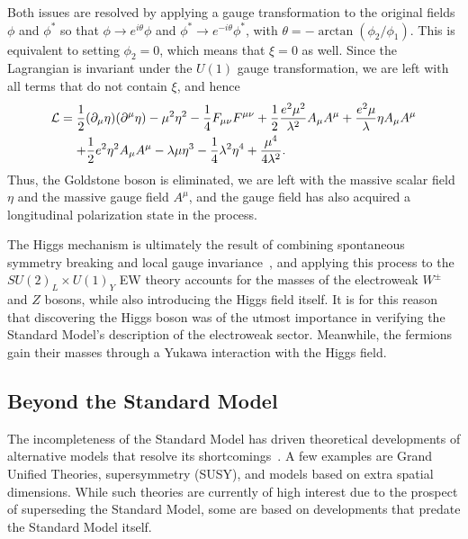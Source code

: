 Both issues are resolved by applying a gauge transformation to the original fields $\phi$ and $\phi^*$ so that $\phi\to e^{i\theta}\phi$ and $\phi^*\to e^{-i\theta}\phi^*$, with $\theta=-\arctan(\phi_2/\phi_1)$.
This is equivalent to setting $\phi_2=0$, which means that $\xi=0$ as well.
Since the Lagrangian is invariant under the $U(1)$ gauge transformation, we are left with all terms that do not contain $\xi$, and hence
\begin{equation}
  \begin{aligned}
    \mathcal{L} &= \frac{1}{2}(\partial_\mu\eta)(\partial^\mu\eta)-\mu^2\eta^2-\frac{1}{4}F_{\mu\nu}F^{\mu\nu}+\frac{1}{2}\frac{e^2\mu^2}{\lambda^2}A_\mu A^\mu+\frac{e^2\mu}{\lambda}\eta A_\mu A^\mu\\
    &\equad+ \frac{1}{2}e^2\eta^2A_\mu A^\mu-\lambda\mu\eta^3-\frac{1}{4}\lambda^2\eta^4+\frac{\mu^4}{4\lambda^2}.
  \end{aligned}
\end{equation}
Thus, the Goldstone boson is eliminated, we are left with the massive scalar field $\eta$ and the massive gauge field $A^\mu$, and the gauge field has also acquired a longitudinal polarization state in the process.

The Higgs mechanism is ultimately the result of combining spontaneous symmetry breaking and local gauge invariance~\cite{Higgs:1964ia}, and applying this process to the $SU(2)_L\times U(1)_Y$ EW theory accounts for the masses of the electroweak $W^\pm$ and $Z$ bosons, while also introducing the Higgs field itself.
It is for this reason that discovering the Higgs boson was of the utmost importance in verifying the Standard Model's description of the electroweak sector.
Meanwhile, the fermions gain their masses through a Yukawa interaction with the Higgs field.

\subsection{Beyond the Standard Model}
\label{subsec:BSM}

The incompleteness of the Standard Model has driven theoretical developments of alternative models that resolve its shortcomings~\cite{2010arXiv1005.1676L}.
A few examples are Grand Unified Theories, supersymmetry (SUSY), and models based on extra spatial dimensions.
While such theories are currently of high interest due to the prospect of superseding the Standard Model, some are based on developments that predate the Standard Model itself.

